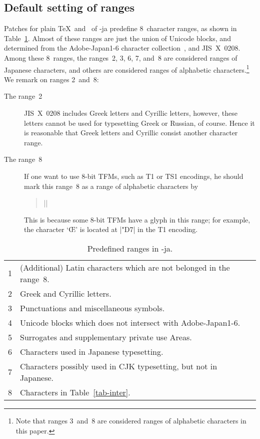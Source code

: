 \documentclass{ajt}
\begin{document}
\subsection{Default setting of ranges}
Patches for plain \TeX\ and \LaTeXe\ of \LuaTeX-ja predefine 8~character
ranges, as shown in Table~\ref{tab-chrrng}.  Almost of these ranges are
just the union of Unicode blocks, and determined from the Adobe-Japan1-6
character collection~\cite{aj16}, and JIS~X~0208. Among these 8~ranges,
the ranges~2, 3, 6, 7, and~8 are considered ranges of Japanese
characters, and others are considered ranges of alphabetic
characters.\footnote{Note that ranges 3~and~8 are considered ranges of
alphabetic characters in this paper.}  We remark on ranges 2~and~8:
\begin{description}
\item[The range~2]
JIS~X~0208 includes Greek letters and Cyrillic letters, however, these
	   letters cannot be used for typesetting Greek or Russian, of
	   course. Hence it is reasonable that Greek letters and
	   Cyrillic consist another character range.
\item[The range~8] 
If one want to use 8-bit TFMs, such as T1 or TS1 encodings, he should
	   mark this range~8 as a range of alphabetic characters by
\begin{quote}
||
\end{quote}
This is because some 8-bit TFMs have a glyph in this range; for example,
	   the character `\OE' is located at |"D7| in the T1 encoding. %
\end{description}


\begin{table}
\caption{Predefined ranges in \LuaTeX-ja.}
\label{tab-chrrng}
\begin{center}
\begin{tabular}{@{\bf}rl}
1&(Additional) Latin characters which are not belonged in the range~8.\\
2&Greek and Cyrillic letters.\\
3&Punctuations and miscellaneous symbols.\\
4&Unicode blocks which does not intersect with Adobe-Japan1-6.\\
5&Surrogates and supplementary private use Areas.\\
6&Characters used in Japanese typesetting.\\
7&Characters possibly used in CJK typesetting, but not in Japanese.\\
8&Characters in Table~\ref{tab-inter}.
\end{tabular}
\end{center}
\end{table}
\end{document}
